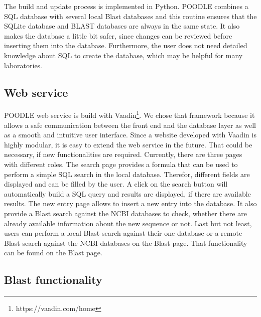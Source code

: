 \documentclass{bioinfo}
\begin{document}
\begin{methods}
The build and update process is implemented in Python. POODLE combines a SQL database with several 
local Blast databases and this routine 
ensures that the SQLite database and BLAST databases are always in the same state. 
It also makes the database a little bit safer, since changes can be reviewed before inserting them 
into the database. Furthermore, the user does not need detailed knowledge about SQL to create the 
database, which may be helpful for many laboratories.

\subsection{Web service}

POODLE web service is build with Vaadin\footnote{https://vaadin.com/home}. We chose that framework 
because it allows a safe 
communication between the front end and the database layer as well as a smooth and intuitive user 
interface. Since a website developed with Vaadin is highly modular, it is easy to extend the web 
service in the future. That could be necessary, if new functionalities are required. Currently, 
there are three pages with different roles. The search page provides a formula that can be used 
to perform a simple SQL search in the local database. Therefor, different fields are displayed and 
can be filled by the user. A click on the search button will automatically build a SQL query and 
results are displayed, if there are available results. The new entry page allows to insert a new 
entry into the database. It also provide a Blast search against the NCBI databases to check, whether 
there are already available information about the new sequence or not. Last but not least, users can 
perform a local Blast search against their one database or a remote Blast search against the NCBI 
databases on the Blast page. That functionality can be found on the Blast page. 

\subsection{Blast functionality}


\end{methods}
\end{document}
